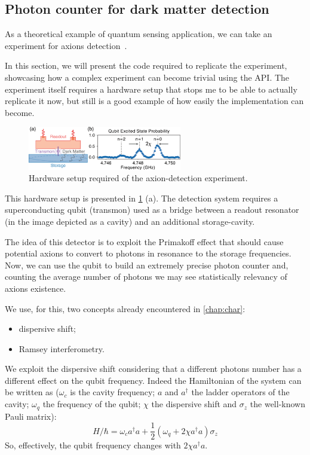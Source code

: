 \subsection*{Photon counter for dark matter detection}

As a theoretical example of quantum sensing application, we can take an experiment for axions detection~\cite{Dixit2021}.

In this section, we will present the code required to replicate the experiment, showcasing how a complex experiment can become trivial using the \Qibosoq API.
The experiment itself requires a hardware setup that stops me to be able to actually replicate it now, but still is a good example of how easily the implementation can become.

\begin{figure}[ht]
    \centering
    \includegraphics[width=0.6\textwidth]{Other sections/figures/dixit_setup.png}
    \caption{Hardware setup required of the axion-detection experiment.}
    \label{fig:dixit_setup}
\end{figure}

This hardware setup is presented in \cref{fig:dixit_setup} (a). 
The detection system requires a superconducting qubit (transmon) used as a bridge between a readout resonator (in the image depicted as a cavity) and an additional storage-cavity.

The idea of this detector is to exploit the Primakoff effect that should cause potential axions to convert to photons in resonance to the storage frequencies.
Now, we can use the qubit to build an extremely precise photon counter and, counting the average number of photons we may see statistically relevancy of axions existence.

We use, for this, two concepts already encountered in \cref{chap:char}:
\begin{itemize}
    \item dispersive shift;
    \item Ramsey interferometry.
\end{itemize}

We exploit the dispersive shift considering that a different photons number has a different effect on the qubit frequency.
Indeed the Hamiltonian of the system can be written as ($\omega_c$ is the cavity frequency; $a$ and $a^\dagger$ the ladder operators of the cavity; $\omega_q$ the frequency of the qubit; $\chi$ the dispersive shift and $\sigma_z$ the well-known Pauli matrix):
\begin{equation}
    H/\hbar = \omega_c a^\dagger a + \frac{1}{2} \left ( \omega_q + 2 \chi a^\dagger a \right) \sigma_z
\end{equation}
So, effectively, the qubit frequency changes with $2\chi a^\dagger a$.

